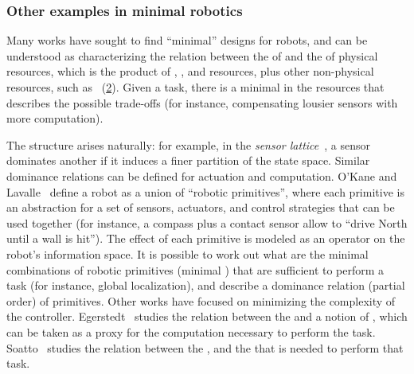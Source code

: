 \begin{figure}[h]
    \centering
    \caption{}
    \label{fig:dp_zia}
\end{figure}

\subsubsection{Other examples in minimal robotics}

Many works have sought to find ``minimal'' designs for robots, and can be understood as characterizing the relation between the  of  and the  of physical resources, which is the product of , , and  resources, plus other non-physical resources, such as ~(\cref{fig:robot-generic}).
Given a task, there is a minimal  in the resources  that describes the possible trade-offs (for instance, compensating lousier sensors with more computation).


\begin{figure}
    \centering
    \caption{}
    \label{fig:robot-generic}
\end{figure}


The  structure arises naturally: for example, in the \emph{sensor lattice}~\cite{lavalle12sensing}, a sensor dominates another if it induces a finer partition of the state space.
Similar dominance relations can be defined for actuation and computation.
O'Kane and Lavalle~\cite{okane08comparing} define a robot as a union of ``robotic primitives'', where each primitive is an abstraction for a set of sensors, actuators, and control strategies that can be used together
(for instance, a compass plus a contact sensor allow to ``drive North until a wall is hit'').
The effect of each primitive is modeled as an operator on the robot's information space.
It is possible to work out what are the minimal combinations of robotic primitives (minimal ) that are sufficient to perform a task (for instance, global localization), and describe a dominance relation (partial order) of primitives.
Other works have focused on minimizing the complexity of the controller.
Egerstedt~\cite{egerstedt03motion} studies the relation between the  and a notion of , which can be taken as a proxy for the computation necessary to perform the task.
Soatto~\cite{soatto11steps} studies the relation between the , and the  that is needed to perform that task.

